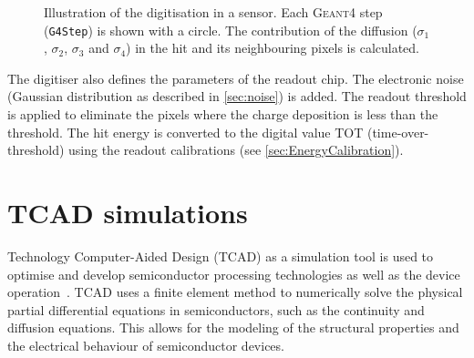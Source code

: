 \begin{figure}[htbp]
  \caption{Illustration of the digitisation in a sensor. Each
    \textsc{Geant4} step (\texttt{G4Step}) is shown with a circle. The
    contribution of the diffusion ($\sigma_1$, $\sigma_2$, $\sigma_3$
    and $\sigma_4$) in the hit and its neighbouring pixels is
    calculated.}
  \label{fig:digitisation}
\end{figure}

The digitiser also defines the parameters of the readout chip. The
electronic noise (Gaussian distribution as described in
\cref{sec:noise}) is added. The readout threshold is applied to
eliminate the pixels where the charge deposition is less than the
threshold. The hit energy is converted to the digital value TOT
(time-over-threshold) using the readout calibrations (see
\cref{sec:EnergyCalibration}).


\section{TCAD simulations}
\label{sec:TCAD}
Technology Computer-Aided Design (TCAD) as a simulation tool is used
to optimise and develop semiconductor processing technologies as well
as the device operation~\cite{synopsysTCAD}. TCAD uses a finite
element method to numerically solve the physical partial differential
equations in semiconductors, such as the continuity and diffusion
equations. This allows for the modeling of the structural properties
and the electrical behaviour of semiconductor devices.

